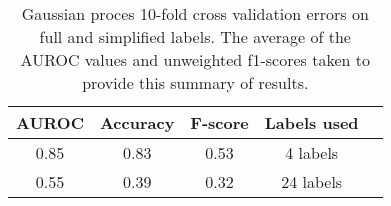 \begin{table}[H]
    \centering
    \caption{Gaussian proces 10-fold cross validation errors on full and simplified labels. The average of the AUROC values and unweighted f1-scores taken to provide this summary of results.}
    \begin{tabular}{|c|c|c|c|c|}
        \hline
        AUROC & Accuracy & F-score & Labels used\\\hline
        0.85 & 0.83 & 0.53 & 4 labels \\
        0.55 & 0.39 & 0.32 & 24 labels \\
        \hline
    \end{tabular}
    \label{table:gperrs}
\end{table}

% 

